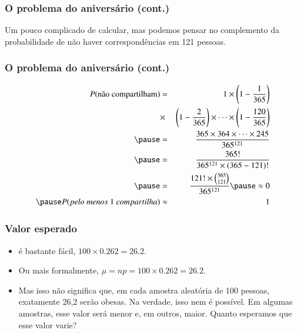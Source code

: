 
\begin{frame}
\frametitle{O problema do aniversário (cont.)}
\justifying
{}

\pause
\justifying
Um pouco complicado de calcular, mas podemos pensar no complemento da probabilidade de não haver correspondências em 121 pessoas.

\vspace{-0.75cm}
\end{frame}

\begin{frame}
\frametitle{O problema do aniversário (cont.)}
\begin{eqnarray*}
P(\mbox{não compartilham}) &=& 1 \times \pr{1 - \frac{1}{365}}  \\
&\times &\pr{1 - \frac{2}{365}} \times \cdots \times \pr{1 - \frac{120}{365}} \\
\pause
&=& \frac{365 \times 364 \times \cdots \times 245}{365^{121}} \\
\pause
&=& \frac{365!}{365^{121} \times (365-121)!} \\
\pause
&=& \frac{121! \times {365 \choose 121}}{365^{121}} 
\pause
\approx 0 \\
\pause
P(pelo~menos~1~compartilha) &\approx& 1
\end{eqnarray*}

\end{frame}



\begin{frame}
\frametitle{Valor esperado}
\justifying
{}

\pause

\begin{itemize}
\justifying
\item é bastante fácil, $100 \times 0.262 = 26.2$.

\pause
\justifying
\item Ou mais formalmente, $\mu = np = 100 \times 0.262 = 26.2$.

\pause
\justifying
\item Mas isso não significa que, em cada amostra aleatória de 100 pessoas, exatamente 26,2 serão obesas. Na verdade, isso nem é possível. Em algumas amostras, esse valor será menor e, em outros, maior. Quanto esperamos que esse valor varie?

\end{itemize}

\end{frame}

